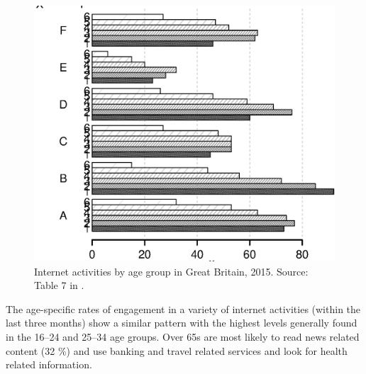 \documentclass[11 pt, a4paper]{report}
\begin{document}
\begin{figure}[hbtp!]
\includegraphics[width=\textwidth]{../figures/Fig7.3.eps}
\caption{Internet activities by age group in Great Britain, 2015. Source: Table 7 in \citet{ONS2015}.}\label{Fig:20} %
\end{figure}

The age-specific rates  of engagement in a variety of internet activities (within the last three months) show a similar pattern with the highest levels generally found in the 16--24 and 25--34 age groups. Over 65s are most likely to read news related content (32 \%) and use banking and travel related services and look for health related information. 
\end{document}
